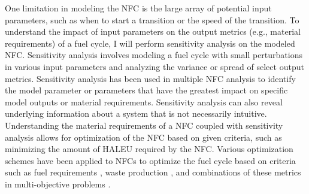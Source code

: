 One limitation in modeling the \gls{NFC} is the large array of potential 
input parameters, such as when to start a transition or the speed of the 
transition. To understand 
the impact of input parameters on the output metrics (e.g., material 
requirements) of a fuel cycle, I will perform sensitivity analysis on the 
modeled \gls{NFC}. Sensitivity analysis involves 
modeling a fuel cycle with small perturbations in various input 
parameters and analyzing the variance or spread of select output metrics. 
Sensitivity analysis has been used in multiple \gls{NFC} analysis 
\cite{chee_sensitivity_2019,feng_sensitivity_2020,thiolliere_methodology_2018}
to identify the model parameter or parameters that have the greatest 
impact on specific model outputs or material requirements. Sensitivity 
analysis can also reveal underlying information about a system that is not 
necessarily intuitive. Understanding the 
material requirements of a \gls{NFC} coupled with sensitivity analysis 
allows for optimization of the \gls{NFC} based on given criteria, such as 
minimizing the amount of \gls{HALEU} required by the \gls{NFC}. Various 
optimization schemes have been applied to \glspl{NFC} to optimize the fuel 
cycle based on criteria such as fuel requirements \cite{kim_selection_1999},
waste production \cite{shwageraus_optimization_2003}, and combinations 
of these metrics in multi-objective 
problems \cite{passerini_systematic_2014}.

